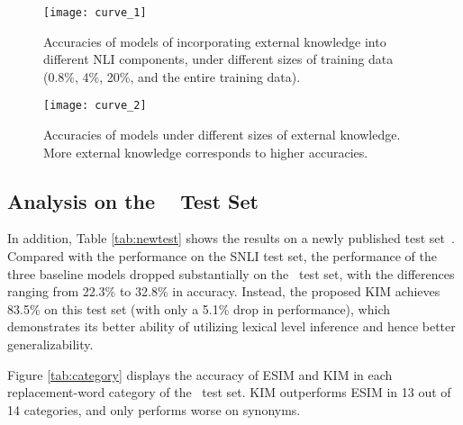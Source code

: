 \documentclass[11pt,a4paper]{article}
\begin{document}
\begin{figure}[!htb]
	\centering
	\texttt{[image: curve\_1]}
	\caption{Accuracies of models of incorporating external knowledge into different NLI components, under different sizes of training data (0.8\%, 4\%, 20\%, and the entire training data).}
\label{fig:curve1}
\end{figure}

\begin{figure}[!htb]
	\centering
	\texttt{[image: curve\_2]}
	\caption{Accuracies of models under different sizes of external knowledge. More external knowledge corresponds to higher accuracies.}
\label{fig:curve2}
\end{figure}

\subsection{Analysis on the ~\citep{glockner_acl18} Test Set}
In addition, Table \ref{tab:newtest} shows the results on a newly published test set~\citep{glockner_acl18}. Compared with the performance on the SNLI test set, the performance of the three baseline models dropped substantially on the~\citep{glockner_acl18} test set, with the differences ranging from 22.3\% to 32.8\% in accuracy. Instead, the proposed KIM achieves 83.5\% on this test set (with only a 5.1\% drop in performance), which demonstrates its better ability of utilizing lexical level inference and hence better generalizability.

Figure \ref{tab:category} displays the accuracy of ESIM and KIM in each replacement-word category of  the~\citep{glockner_acl18} test set. KIM outperforms ESIM in 13 out of 14 categories, and only performs worse on synonyms. 

\begin{table}[t!]
\renewcommand{\arraystretch}{0.9}
\begin{center}
\end{center}
\caption{Accuracies of models on the SNLI and ~\citep{glockner_acl18} test set. * indicates the results taken from \citep{glockner_acl18}.}
\label{tab:newtest}
\end{table}
\end{document}
